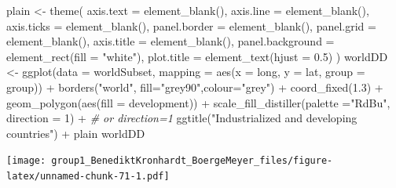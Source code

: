 \documentclass[
  11pt,
  a4paper,
  twoside]{scrbook}
\newenvironment{Shaded}{\begin{snugshade}}{\end{snugshade}}
\newcommand{\AttributeTok}[1]{\textcolor[rgb]{0.77,0.63,0.00}{#1}}
\newcommand{\CommentTok}[1]{\textcolor[rgb]{0.56,0.35,0.01}{\textit{#1}}}
\newcommand{\DecValTok}[1]{\textcolor[rgb]{0.00,0.00,0.81}{#1}}
\newcommand{\FloatTok}[1]{\textcolor[rgb]{0.00,0.00,0.81}{#1}}
\newcommand{\FunctionTok}[1]{\textcolor[rgb]{0.00,0.00,0.00}{#1}}
\newcommand{\NormalTok}[1]{#1}
\newcommand{\OtherTok}[1]{\textcolor[rgb]{0.56,0.35,0.01}{#1}}
\newcommand{\SpecialCharTok}[1]{\textcolor[rgb]{0.00,0.00,0.00}{#1}}
\newcommand{\StringTok}[1]{\textcolor[rgb]{0.31,0.60,0.02}{#1}}
\begin{document}
\linespread{1}

\begin{Shaded}
\begin{Highlighting}[]

\NormalTok{plain }\OtherTok{\textless{}{-}} \FunctionTok{theme}\NormalTok{(}
  \AttributeTok{axis.text =} \FunctionTok{element\_blank}\NormalTok{(),}
  \AttributeTok{axis.line =} \FunctionTok{element\_blank}\NormalTok{(),}
  \AttributeTok{axis.ticks =} \FunctionTok{element\_blank}\NormalTok{(),}
  \AttributeTok{panel.border =} \FunctionTok{element\_blank}\NormalTok{(),}
  \AttributeTok{panel.grid =} \FunctionTok{element\_blank}\NormalTok{(),}
  \AttributeTok{axis.title =} \FunctionTok{element\_blank}\NormalTok{(),}
  \AttributeTok{panel.background =} \FunctionTok{element\_rect}\NormalTok{(}\AttributeTok{fill =} \StringTok{"white"}\NormalTok{),}
  \AttributeTok{plot.title =} \FunctionTok{element\_text}\NormalTok{(}\AttributeTok{hjust =} \FloatTok{0.5}\NormalTok{)}
\NormalTok{)}
\NormalTok{worldDD }\OtherTok{\textless{}{-}} \FunctionTok{ggplot}\NormalTok{(}\AttributeTok{data =}\NormalTok{ worldSubset, }\AttributeTok{mapping =} \FunctionTok{aes}\NormalTok{(}\AttributeTok{x =}\NormalTok{ long, }\AttributeTok{y =}\NormalTok{ lat, }\AttributeTok{group =}\NormalTok{ group)) }\SpecialCharTok{+}
  \FunctionTok{borders}\NormalTok{(}\StringTok{"world"}\NormalTok{, }\AttributeTok{fill=}\StringTok{"grey90"}\NormalTok{,}\AttributeTok{colour=}\StringTok{"grey"}\NormalTok{) }\SpecialCharTok{+} 
  \FunctionTok{coord\_fixed}\NormalTok{(}\FloatTok{1.3}\NormalTok{) }\SpecialCharTok{+}
  \FunctionTok{geom\_polygon}\NormalTok{(}\FunctionTok{aes}\NormalTok{(}\AttributeTok{fill =}\NormalTok{ development)) }\SpecialCharTok{+}
  \FunctionTok{scale\_fill\_distiller}\NormalTok{(}\AttributeTok{palette =}\StringTok{"RdBu"}\NormalTok{, }\AttributeTok{direction =} \DecValTok{1}\NormalTok{) }\SpecialCharTok{+} \CommentTok{\# or direction=1}
  \FunctionTok{ggtitle}\NormalTok{(}\StringTok{"Industrialized and developing countries"}\NormalTok{) }\SpecialCharTok{+}
\NormalTok{  plain}
\NormalTok{worldDD}
\end{Highlighting}
\end{Shaded}

\linespread{1}\texttt{[image: group1\_BenediktKronhardt\_BoergeMeyer\_files/figure-latex/unnamed-chunk-71-1.pdf]}

\linespread{1}
\end{document}
